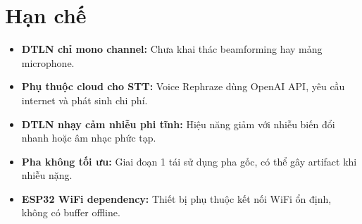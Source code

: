 \section{Hạn chế}

\begin{itemize}
\item
  \textbf{DTLN chỉ mono channel:} Chưa khai thác beamforming hay mảng microphone.
\item
  \textbf{Phụ thuộc cloud cho STT:} Voice Rephraze dùng OpenAI API,
  yêu cầu internet và phát sinh chi phí.
\item
  \textbf{DTLN nhạy cảm nhiễu phi tĩnh:} Hiệu năng giảm với nhiễu
  biến đổi nhanh hoặc âm nhạc phức tạp.
\item
  \textbf{Pha không tối ưu:} Giai đoạn 1 tái sử dụng pha gốc, có thể
  gây artifact khi nhiễu nặng.
\item
  \textbf{ESP32 WiFi dependency:} Thiết bị phụ thuộc kết nối WiFi ổn định,
  không có buffer offline.
\end{itemize}
